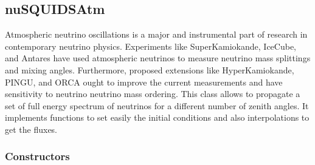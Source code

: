 
\newcommand{\jt}[2]{
\item[$\circ$]{#1}
  \begin{lstlisting}
    {#2}
  \end{lstlisting}
}

\subsection{nuSQUIDSAtm}

Atmospheric neutrino oscillations is a major and instrumental part of
research in contemporary neutrino physics. Experiments like
SuperKamiokande, IceCube, and Antares have used atmospheric neutrinos
to measure neutrino mass splittings and mixing angles. Furthermore,
proposed extensions like HyperKamiokande, PINGU, and ORCA ought to
improve the current measurements and have sensitivity to neutrino
neutrino mass ordering. This class allows to propagate a set of full
energy spectrum of neutrinos for a different number of zenith angles.
It implements functions to set easily the initial conditions and also
interpolations to get the fluxes.
\subsubsection{Constructors}

